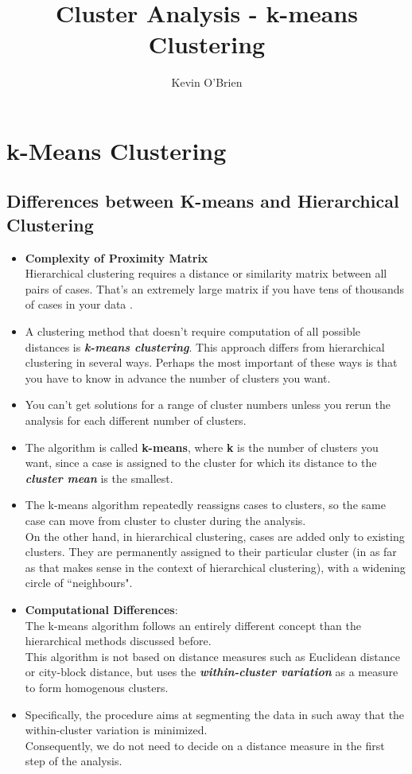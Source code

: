\documentclass[12pt]{article}
\begin{document}
\author{Kevin O'Brien}
\title{Cluster Analysis - k-means Clustering}
\Large
\tableofcontents
\newpage

\section{k-Means Clustering}
\tableofcontents
\newpage %
\subsection{Differences between K-means and Hierarchical Clustering}
\begin{itemize}
\item \textbf{Complexity of Proximity Matrix} \\  Hierarchical clustering requires a distance or similarity matrix between all pairs of cases. That's an extremely large matrix if you have tens of thousands of cases in your data .

\item A clustering method that doesn't require computation of all possible distances is \textbf{\textit{k-means clustering}}. This approach differs from hierarchical clustering in several ways. Perhaps the most important of these ways is that you have to know in advance the number of clusters you want. 
\item You can't get solutions for a range of cluster numbers unless you rerun the analysis for each different number of clusters.

\item The algorithm is called \textbf{k-means}, where \textbf{k} is the number of clusters you want, since a case is assigned to the cluster for which its distance to the \textbf{\textit{cluster mean}} is the smallest.


\item The k-means algorithm repeatedly reassigns cases to clusters, so the same case can move from cluster to cluster during the analysis. \\On the other hand, in hierarchical clustering, cases are added only to existing clusters. They are permanently assigned to their particular cluster (in as far as that makes sense in the context of hierarchical clustering), with a widening circle of ``neighbours".

\newpage



\item \textbf{Computational Differences}: \\ The k-means algorithm follows an entirely different concept than the hierarchical methods
discussed before.\\ This algorithm is not based on distance measures such as
Euclidean distance or city-block distance, but uses the \textbf{\textit{within-cluster variation}} as a measure to form homogenous clusters. 
\item 
Specifically, the procedure aims at segmenting
the data in such away that the within-cluster variation is minimized.\\ Consequently, we
do not need to decide on a distance measure in the first step of the analysis.


\end{itemize}
\end{document}
